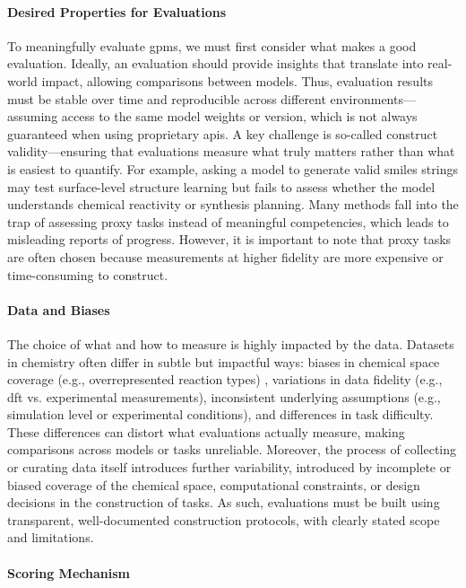 \paragraph{Desired Properties for Evaluations}
To meaningfully evaluate \glspl{gpm}, we must first consider what makes a good evaluation. 
Ideally, an evaluation should provide insights that translate into real-world impact, allowing comparisons between models. 
Thus, evaluation results must be stable over time and reproducible across different environments---assuming access to the same model weights or version, which is not always guaranteed when using proprietary \glspl{api}. \autocite{Ollion2024dangers}
A key challenge is so-called construct validity---ensuring that evaluations measure what truly matters rather than what is easiest to quantify. For example, asking a model to generate valid \gls{smiles} strings may test surface-level structure learning but fails to assess whether the model understands chemical reactivity or synthesis planning.
Many methods fall into the trap of assessing proxy tasks instead of meaningful competencies, which leads to misleading reports of progress. 
However, it is important to note that proxy tasks are often chosen because measurements at higher fidelity are more expensive or time-consuming to construct. 


\paragraph{Data and Biases} The choice of what and how to measure is highly impacted by the data. 
Datasets in chemistry often differ in subtle but impactful ways: biases in chemical space coverage (e.g., overrepresented reaction types) \autocite{Jia_2019anthropogenic,Fujinuma_2022why}, variations in data fidelity (e.g., \gls{dft} vs. experimental measurements),  inconsistent underlying assumptions (e.g., simulation level or experimental conditions), and differences in task difficulty. 
These differences can distort what evaluations actually measure, making comparisons across models or tasks unreliable. \autocite{peng2024survey}
Moreover, the process of collecting or curating data itself introduces further variability, introduced by incomplete or biased coverage of the chemical space, computational constraints, or design decisions in the construction of tasks. 
As such, evaluations must be built using transparent, well-documented construction protocols, with clearly stated scope and limitations.


\paragraph{Scoring Mechanism} 

